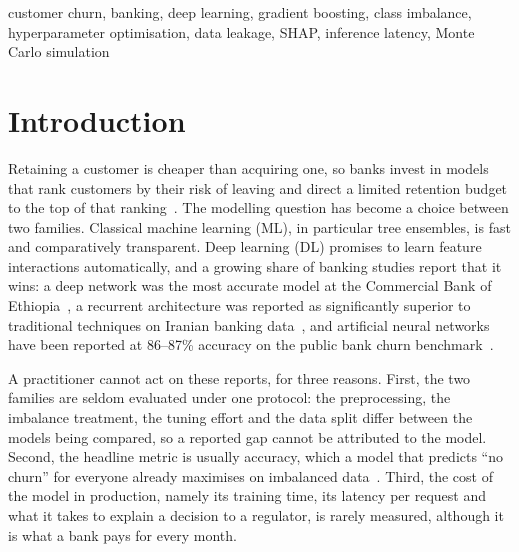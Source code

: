 \documentclass[conference]{IEEEtran}
\begin{document}
\begin{IEEEkeywords}
customer churn, banking, deep learning, gradient boosting, class imbalance, hyperparameter optimisation, data leakage, SHAP, inference latency, Monte Carlo simulation
\end{IEEEkeywords}

\section{Introduction}
Retaining a customer is cheaper than acquiring one, so banks invest in models that rank customers by their risk of leaving and direct a limited retention budget to the top of that ranking~\cite{verbeke2012new,manzoor2024review}. The modelling question has become a choice between two families. Classical machine learning (ML), in particular tree ensembles, is fast and comparatively transparent. Deep learning (DL) promises to learn feature interactions automatically, and a growing share of banking studies report that it wins: a deep network was the most accurate model at the Commercial Bank of Ethiopia~\cite{seid2022machine}, a recurrent architecture was reported as significantly superior to traditional techniques on Iranian banking data~\cite{haddadi2022iranian}, and artificial neural networks have been reported at 86--87\% accuracy on the public bank churn benchmark~\cite{zaky2022banking,baby2023artificial}.

A practitioner cannot act on these reports, for three reasons. First, the two families are seldom evaluated under one protocol: the preprocessing, the imbalance treatment, the tuning effort and the data split differ between the models being compared, so a reported gap cannot be attributed to the model. Second, the headline metric is usually accuracy, which a model that predicts ``no churn'' for everyone already maximises on imbalanced data~\cite{raj2023machine}. Third, the cost of the model in production, namely its training time, its latency per request and what it takes to explain a decision to a regulator, is rarely measured, although it is what a bank pays for every month.
\end{document}

